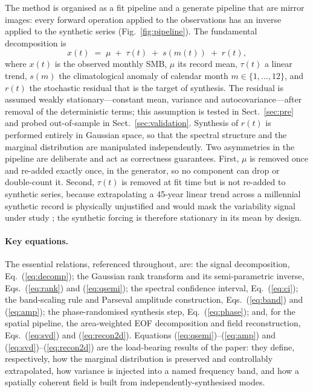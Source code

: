 The method is organised as a fit pipeline and a generate pipeline that are
mirror images: every forward operation applied to the observations has an
inverse applied to the synthetic series (Fig.~\ref{fig:pipeline}). The
fundamental decomposition is
\begin{equation}\label{eq:decomp}
  x(t) \;=\; \mu \;+\; \tau(t) \;+\; s\!\left(m(t)\right) \;+\; r(t),
\end{equation}
where $x(t)$ is the observed monthly SMB, $\mu$ its record mean, $\tau(t)$ a
linear trend, $s(m)$ the climatological anomaly of calendar month
$m\in\{1,\dots,12\}$, and $r(t)$ the stochastic residual that is the target
of synthesis. The residual is assumed weakly stationary---constant mean,
variance and autocovariance---after removal of the deterministic terms; this
assumption is tested in Sect.~\ref{sec:pre} and probed out-of-sample in
Sect.~\ref{sec:validation}. Synthesis of $r(t)$ is performed entirely in
Gaussian space, so that the spectral structure and the marginal distribution
are manipulated independently. Two asymmetries in the pipeline are deliberate
and act as correctness guarantees. First, $\mu$ is removed once and re-added
exactly once, in the generator, so no component can drop or double-count it.
Second, $\tau(t)$ is removed at fit time but is not re-added to synthetic
series, because extrapolating a 45-year linear trend across a millennial
synthetic record is physically unjustified and would mask the variability
signal under study \citep[cf.][]{hasselmann1976}; the synthetic forcing is
therefore stationary in its mean by design.

\paragraph{Key equations.} The essential relations, referenced throughout,
are: the signal decomposition, Eq.~(\ref{eq:decomp}); the Gaussian rank
transform and its semi-parametric inverse, Eqs.~(\ref{eq:rank}) and
(\ref{eq:qsemi}); the spectral confidence interval, Eq.~(\ref{eq:ci}); the
band-scaling rule and Parseval amplitude construction, Eqs.~(\ref{eq:band})
and (\ref{eq:amp}); the phase-randomised synthesis step, Eq.~(\ref{eq:phase});
and, for the spatial pipeline, the area-weighted EOF decomposition and field
reconstruction, Eqs.~(\ref{eq:svd}) and (\ref{eq:recon2d}). Equations
(\ref{eq:qsemi})--(\ref{eq:amp}) and (\ref{eq:svd})--(\ref{eq:recon2d}) are
the load-bearing results of the paper: they define, respectively, how the
marginal distribution is preserved and controllably extrapolated, how
variance is injected into a named frequency band, and how a spatially
coherent field is built from independently-synthesised modes.

